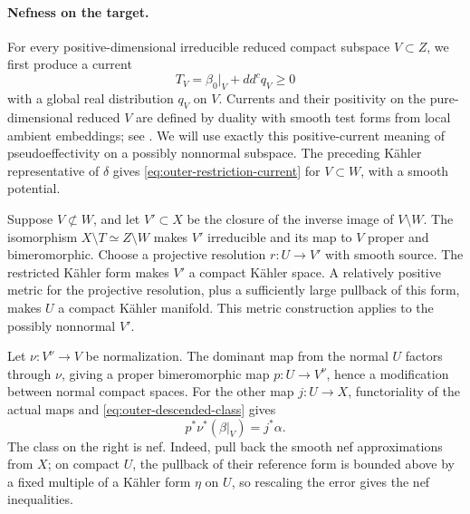 \paragraph{Nefness on the target.}
For every positive-dimensional irreducible reduced compact subspace
\(V\subset Z\), we first produce a current
\begin{equation}\label{eq:outer-restriction-current}
 T_V=\beta_0|_V+dd^c q_V\geq0
\end{equation}
with a global real distribution \(q_V\) on \(V\).  Currents and their
positivity on the pure-dimensional reduced \(V\) are defined by duality
with smooth test forms from local ambient embeddings; see
\cite[Section~1, Definitions~1.1--1.2, pp.~14--15]{Demailly1985}.
We will use exactly this positive-current meaning of pseudoeffectivity
on a possibly nonnormal subspace.  The preceding K\"ahler representative
of \(\delta\) gives \eqref{eq:outer-restriction-current} for
\(V\subset W\), with a smooth potential.

Suppose \(V\not\subset W\), and let \(V'\subset X\) be the closure
of the inverse image of \(V\setminus W\).  The isomorphism
\(X\setminus T\simeq Z\setminus W\) makes \(V'\) irreducible and
its map to \(V\) proper and bimeromorphic.  Choose a projective
resolution \(r:U\to V'\) with smooth source.  The restricted K\"ahler
form makes \(V'\) a compact K\"ahler space.  A relatively positive
metric for the projective resolution, plus a sufficiently large pullback
of this form, makes \(U\) a compact K\"ahler manifold.  This metric
construction applies to the possibly nonnormal \(V'\).

Let \(\nu:V^\nu\to V\) be normalization.  The dominant map from the
normal \(U\) factors through \(\nu\), giving a proper bimeromorphic
map \(p:U\to V^\nu\), hence a modification between normal compact
spaces.  For the other map \(j:U\to X\), functoriality of the actual
maps and \eqref{eq:outer-descended-class} gives
\[
 p^*\nu^*(\beta|_V)=j^*\alpha.
\]
The class on the right is nef.  Indeed, pull back the smooth nef
approximations from \(X\); on compact \(U\), the pullback of their
reference form is bounded above by a fixed multiple of a K\"ahler form
\(\eta\) on \(U\), so rescaling the error gives the nef inequalities.

